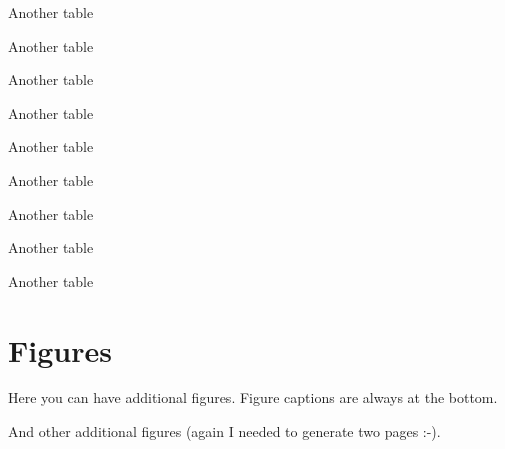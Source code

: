 \documentclass[msc,oneside]{ubcthesis}%
\begin{document}
\begin{table}
\caption{Another table}
\end{table}
\begin{table}
\caption{Another table}
\end{table}
\begin{table}
\caption{Another table}
\end{table}
\begin{table}
\caption{Another table}
\end{table}

\begin{table}
\caption{Another table}
\end{table}
\begin{table}
\caption{Another table}
\end{table}
\begin{table}
\caption{Another table}
\end{table}
\begin{table}
\caption{Another table}
\end{table}
\begin{table}
\caption{Another table}
\end{table}

\chapter{Figures}
Here you can have additional figures. Figure captions are always at the bottom.

\newpage

And other additional figures (again I needed to generate two pages :-).
\end{document}
